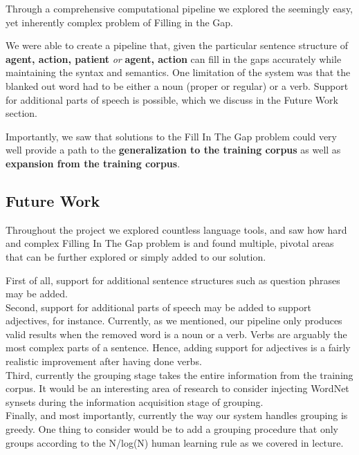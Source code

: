 \documentclass{article}[12pt]
\theoremstyle{definition}
\begin{document}
Through a comprehensive computational pipeline we explored the seemingly easy, yet inherently complex problem of Filling in the Gap. 

We were able to create a pipeline that, given the particular sentence structure of \textbf{agent, action, patient} \emph{or} \textbf{agent, action} can fill in the gaps accurately while maintaining the syntax and semantics. One limitation of the system was that the blanked out word had to be either a noun (proper or regular) or a verb. Support for additional parts of speech is possible, which we discuss in the Future Work section. 

Importantly, we saw that solutions to the Fill In The Gap problem could very well provide a path to the \textbf{generalization to the training corpus} as well as \textbf{expansion from the training corpus}. 

\subsection{Future Work}

Throughout the project we explored countless language tools, and saw how hard and complex Filling In The Gap problem is and found multiple, pivotal areas that can be further explored or simply added to our solution. 

First of all, support for additional sentence structures such as question phrases may be added. \\

Second, support for additional parts of speech may be added to support adjectives, for instance. Currently, as we mentioned, our pipeline only produces valid results when the removed word is a noun or a verb. Verbs are arguably the most complex parts of a sentence. Hence, adding support for adjectives is a fairly realistic improvement after having done verbs. \\

Third, currently the grouping stage takes the entire information from the training corpus. It would be an interesting area of research to consider injecting WordNet synsets during the information acquisition stage of grouping. \\

Finally, and most importantly, currently the way our system handles grouping is greedy. One thing to consider would be to add a grouping procedure that only groups according to the N/log(N) human learning rule as we covered in lecture. 
\end{document}
